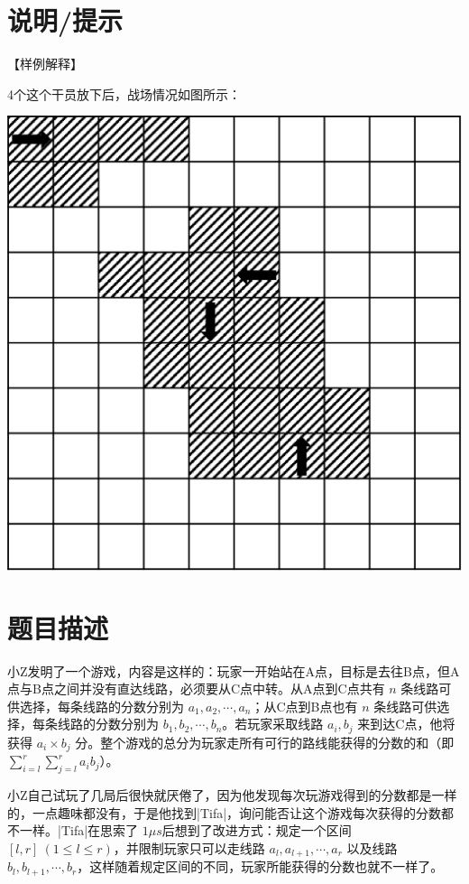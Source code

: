 \documentclass{ctpro}
\begin{document}
\section*{说明/提示}
【样例解释】

4个这个干员放下后，战场情况如图所示：

\begin{center}
	\includegraphics{images/battlefield.png}
\end{center}

\makeproblem
\section*{题目描述}
小Z发明了一个游戏，内容是这样的：玩家一开始站在A点，目标是去往B点，但A点与B点之间并没有直达线路，必须要从C点中转。从A点到C点共有 $n$ 条线路可供选择，每条线路的分数分别为 $a_1, a_2, \cdots, a_n$；从C点到B点也有 $n$ 条线路可供选择，每条线路的分数分别为 $b_1, b_2, \cdots, b_n$。若玩家采取线路 $a_i, b_j$ 来到达C点，他将获得 $a_i \times b_j$ 分。整个游戏的总分为玩家走所有可行的路线能获得的分数的和（即 $\sum_{i=l}^r \sum_{j=l}^r a_i b_j$）。

小Z自己试玩了几局后很快就厌倦了，因为他发现每次玩游戏得到的分数都是一样的，一点趣味都没有，于是他找到|Tifa|，询问能否让这个游戏每次获得的分数都不一样。|Tifa|在思索了 $1 \mu s$后想到了改进方式：规定一个区间 $[l,r]~(1 \leq l \leq r)$，并限制玩家只可以走线路 $a_l, a_{l+1}, \cdots, a_r$ 以及线路 $b_l, b_{l+1}, \cdots, b_r$，这样随着规定区间的不同，玩家所能获得的分数也就不一样了。
\end{document}
